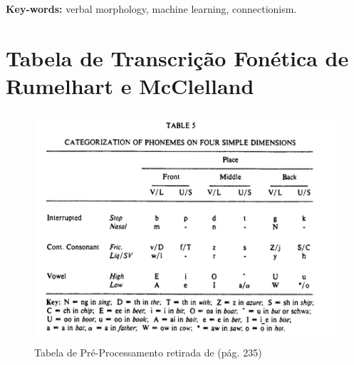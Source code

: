 \documentclass[12pt,twoside,a4paper]{book}
\begin{document}
 \textbf{Key-words:}
verbal morphology, machine learning, connectionism.





\tableofcontents

\onehalfspacing            %
\mainmatter
{}

\fancyhead[RE,LO]{\thesection}






 \singlespacing   %
\clearpage

\appendix

\chapter{Tabela de Transcrição Fonética de Rumelhart e McClelland}
\label{apendice:rumelhart}
\begin{figure}
    \centering
    \includegraphics[scale=0.8]{img/rumelhartpreprocess.png}
    \caption{Tabela de Pré-Processamento retirada de \cite{rumelhart:1986} (pág. 235)}
    \label{fig:preprocess-rumelhart}
\end{figure}
\end{document}

